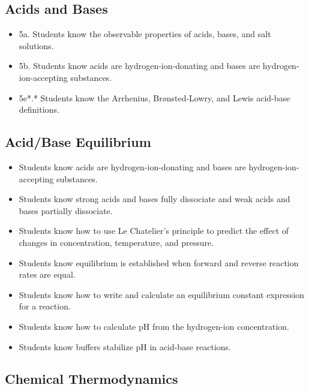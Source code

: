 \documentclass[12pt]{article}
\begin{document}
\subsection{Acids and Bases}

\begin{itemize}
    \item 5a. Students know the observable properties of acids, bases, and salt solutions.
    \item 5b. Students know acids are hydrogen-ion-donating and bases are hydrogen-ion-accepting substances.
    \item 5e*.* Students know the Arrhenius, Brønsted-Lowry, and Lewis acid-base definitions.
\end{itemize}


\subsection{Acid/Base Equilibrium}

\begin{itemize}
    \item Students know acids are hydrogen-ion-donating and bases are hydrogen-ion-accepting substances.
    \item Students know strong acids and bases fully dissociate and weak acids and bases partially dissociate.
    \item Students know how to use Le Chatelier's principle to predict the effect of changes in concentration, temperature, and pressure.
    \item Students know equilibrium is established when forward and reverse reaction rates are equal.
    \item Students know how to write and calculate an equilibrium constant expression for a reaction.
    \item Students know how to calculate pH from the hydrogen-ion concentration.
    \item Students know buffers stabilize pH in acid-base reactions.
\end{itemize}

\subsection{Chemical Thermodynamics}
\end{document}
